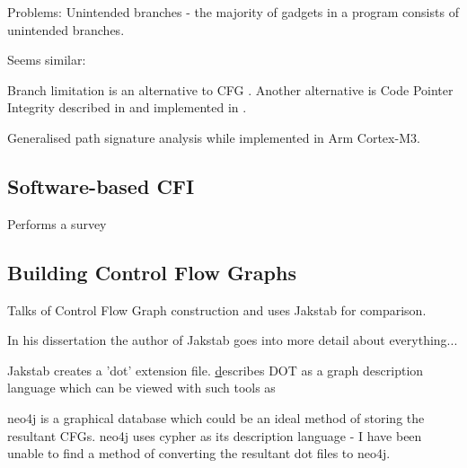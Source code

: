 Problems: Unintended branches \cite{Kayaalp2014} - the majority of gadgets in a program consists of unintended branches. 

Seems similar: \cite{Mao2010}

Branch limitation is an alternative to CFG \cite{He2017} \cite{Corporation2017}.
Another alternative is Code Pointer Integrity described in \cite{Security2017} and implemented in \cite{Kuznetsov:204783} \cite{Mashtizadeh2014} \cite{Szekeres2013}.

Generalised path signature analysis \cite{Mahmood1988} while \cite{Werner2016} implemented in Arm Cortex-M3.

\subsection{Software-based CFI}
\cite{Burow} Performs a survey

\subsection{Building Control Flow Graphs}
\cite{Nguyen2013} Talks of Control Flow Graph construction and uses Jakstab\cite{Kinder2008} for comparison. 


In his dissertation \cite{Kinder2010} the author of Jakstab goes into more detail about everything...

Jakstab creates a 'dot' extension file. \href{https://en.wikipedia.org/wiki/DOT_(graph_description_language)} describes DOT as a graph description language which can be viewed with such tools as 

neo4j is a graphical database which could be an ideal method of storing the resultant CFGs. neo4j uses cypher as its description language - I have been unable to find a method of converting the resultant dot files to neo4j.
 
